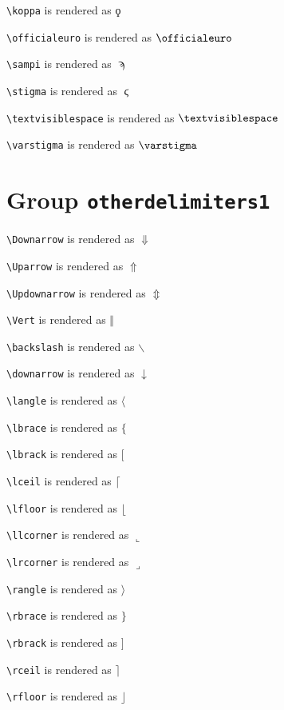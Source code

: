\texttt{\textbackslash koppa} is rendered as $\koppa$

\texttt{\textbackslash officialeuro} is rendered as $\officialeuro$

\texttt{\textbackslash sampi} is rendered as $\sampi$

\texttt{\textbackslash stigma} is rendered as $\stigma$

\texttt{\textbackslash textvisiblespace} is rendered as $\textvisiblespace$

\texttt{\textbackslash varstigma} is rendered as $\varstigma$

\section{ Group \texttt{other\textunderscore delimiters1}}

\texttt{\textbackslash Downarrow} is rendered as $\Downarrow$

\texttt{\textbackslash Uparrow} is rendered as $\Uparrow$

\texttt{\textbackslash Updownarrow} is rendered as $\Updownarrow$

\texttt{\textbackslash Vert} is rendered as $\Vert$

\texttt{\textbackslash backslash} is rendered as $\backslash$

\texttt{\textbackslash downarrow} is rendered as $\downarrow$

\texttt{\textbackslash langle} is rendered as $\langle$

\texttt{\textbackslash lbrace} is rendered as $\lbrace$

\texttt{\textbackslash lbrack} is rendered as $\lbrack$

\texttt{\textbackslash lceil} is rendered as $\lceil$

\texttt{\textbackslash lfloor} is rendered as $\lfloor$

\texttt{\textbackslash llcorner} is rendered as $\llcorner$

\texttt{\textbackslash lrcorner} is rendered as $\lrcorner$

\texttt{\textbackslash rangle} is rendered as $\rangle$

\texttt{\textbackslash rbrace} is rendered as $\rbrace$

\texttt{\textbackslash rbrack} is rendered as $\rbrack$

\texttt{\textbackslash rceil} is rendered as $\rceil$

\texttt{\textbackslash rfloor} is rendered as $\rfloor$

